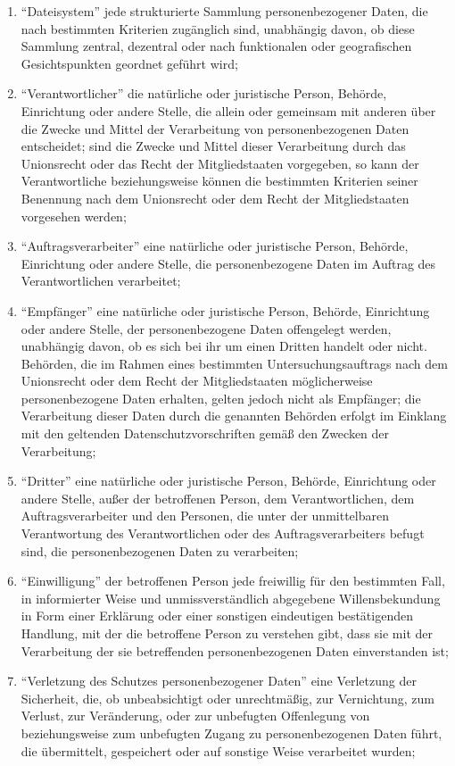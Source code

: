 \begin{enumerate}[label=\arabic*.]
            \item ``Dateisystem'' jede strukturierte Sammlung personenbezogener Daten, die nach bestimmten Kriterien zugänglich sind, unabhängig davon, ob diese Sammlung zentral, dezentral oder nach funktionalen oder geografischen Gesichtspunkten geordnet geführt wird;
            \item ``Verantwortlicher'' die natürliche oder juristische Person, Behörde, Einrichtung oder andere Stelle, die allein oder gemeinsam mit anderen über die Zwecke und Mittel der Verarbeitung von personenbezogenen Daten entscheidet; sind die Zwecke und Mittel dieser Verarbeitung durch das Unionsrecht oder das Recht der Mitgliedstaaten vorgegeben, so kann der Verantwortliche beziehungsweise können die bestimmten Kriterien seiner Benennung nach dem Unionsrecht oder dem Recht der Mitgliedstaaten vorgesehen werden;
            \item ``Auftragsverarbeiter'' eine natürliche oder juristische Person, Behörde, Einrichtung oder andere Stelle, die personenbezogene Daten im Auftrag des Verantwortlichen verarbeitet;
            \item ``Empfänger'' eine natürliche oder juristische Person, Behörde, Einrichtung oder andere Stelle, der personenbezogene Daten offengelegt werden, unabhängig davon, ob es sich bei ihr um einen Dritten handelt oder nicht. Behörden, die im Rahmen eines bestimmten Untersuchungsauftrags nach dem Unionsrecht oder dem Recht der Mitgliedstaaten möglicherweise personenbezogene Daten erhalten, gelten jedoch nicht als Empfänger; die Verarbeitung dieser Daten durch die genannten Behörden erfolgt im Einklang mit den geltenden Datenschutzvorschriften gemäß den Zwecken der Verarbeitung;
            \item  ``Dritter'' eine natürliche oder juristische Person, Behörde, Einrichtung oder andere Stelle, außer der betroffenen Person, dem Verantwortlichen, dem Auftragsverarbeiter und den Personen, die unter der unmittelbaren Verantwortung des Verantwortlichen oder des Auftragsverarbeiters befugt sind, die personenbezogenen Daten zu verarbeiten;
            \item ``Einwilligung'' der betroffenen Person jede freiwillig für den bestimmten Fall, in informierter Weise und unmissverständlich abgegebene Willensbekundung in Form einer Erklärung oder einer sonstigen eindeutigen bestätigenden Handlung, mit der die betroffene Person zu verstehen gibt, dass sie mit der Verarbeitung der sie betreffenden personenbezogenen Daten einverstanden ist;
            \item ``Verletzung des Schutzes personenbezogener Daten'' eine Verletzung der Sicherheit, die, ob unbeabsichtigt oder unrechtmäßig, zur Vernichtung, zum Verlust, zur Veränderung, oder zur unbefugten Offenlegung von beziehungsweise zum unbefugten Zugang zu personenbezogenen Daten führt, die übermittelt, gespeichert oder auf sonstige Weise verarbeitet wurden;

\end{enumerate}
